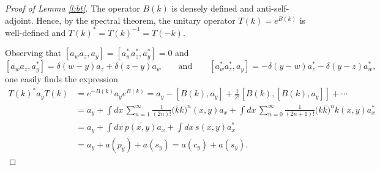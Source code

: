 \documentclass[11pt,a4paper,draft,DIV11]{scrartcl}	%
\newcommand{\N}{\mathcal{N}}
\begin{document}
\begin{proof}[Proof of Lemma \ref{l:bt}]
  The operator $B(k)$ is densely defined and anti-self-adjoint.
  Hence, by the spectral theorem, the unitary operator $T(k) = e^{B(k)}$ is
  well-defined and $T(k)^* = T(k)^{-1} = T(-k)$.
\iffalse
  Let $\chi$ be the characteristic function, and consider a real number $M >
  0$. We give a proof of the formulae on the subspace $\chi(\N \le M)
  \mathcal{F}$, and then we indicate how to extend it to the whole
  $\mathcal{F}$. First, note that $B(k)$ and $a(f)$ are bounded operators on
  $\chi(\N \le M) \mathcal{F}$. Recall the formula
  \[
    e^X Y e^{-X} = Y + [X,Y] + \frac{1}{2!} [X,[X,Y]] + \cdots
  \]
\fi

  Observing that $[a_w a_z, a_y] = [a_w^* a_z^*, a_y^*] = 0$ and
  \[
    [a_w a_z, a_y^*] = \delta(w-y) a_z + \delta(z-y) a_w \qquad \text{and}
    \qquad [a_w^* a_z^*, a_y] = -\delta(y-w) a_z^* - \delta(y-z) a_w^*,
  \]
  one easily finds the expression
  \begin{align*}
    T(k)^* a_y T(k) & = e^{-B(k)} a_y e^{B(k)} = a_y - [B(k), a_y] +
    \frac{1}{2!} [B(k), [B(k), a_y]] + \cdots \\
    & = a_y + \int dx \, \sum_{n=1}^\infty \frac{1}{(2n)!} \big( 
    \overline{k} k \big)^n(x,y) a_x + \int dx \, \sum_{n=0}^\infty
    \frac{1}{(2n+1)!} \big( k \overline{k} \big)^n k(x,y) a_x^* \\
    & = a_y + \int dx \, \overline{p(x,y)} a_x + \int dx \, s(x,y) a_x^* \\
    & = a_y + a(p_y) + a(s_y) = a(c_y) + a(s_y).
  \end{align*}



\end{proof}
\end{document}
